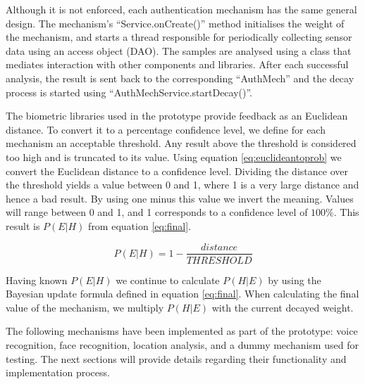 Although it is not enforced, each authentication mechanism has the same general design. The mechanism's ``Service.onCreate()'' method initialises the weight of the mechanism, and starts a thread responsible for periodically collecting sensor data using an access object (DAO). The samples are analysed using a class that mediates interaction with other components and libraries. After each successful analysis, the result is sent back to the corresponding ``AuthMech'' and the decay process is started using ``AuthMechService.startDecay()''.

The biometric libraries used in the prototype provide feedback as an Euclidean distance. To convert it to a percentage confidence level, we define for each mechanism an acceptable threshold. Any result above the threshold is considered too high and is truncated to its value. Using equation \ref{eq:euclideantoprob} we convert the Euclidean distance to a confidence level. Dividing the distance over the threshold yields a value between 0 and 1, where 1 is a very large distance and hence a bad result. By using one minus this value we invert the meaning. Values will range between 0 and 1, and 1 corresponds to a confidence level of $100\%$. This result is $P(E|H)$ from equation \ref{eq:final}.

\begin{equation} 
\label{eq:euclideantoprob}
P(E|H) = 1 - \frac{distance}{THRESHOLD}
\end{equation}

Having known $P(E|H)$ we continue to calculate $P(H|E)$ by using the Bayesian update formula defined in equation \ref{eq:final}. When calculating the final value of the mechanism, we multiply $P(H|E)$ with the current decayed weight.

The following mechanisms have been implemented as part of the prototype: voice recognition, face recognition, location analysis, and a dummy mechanism used for testing. The next sections will provide details regarding their functionality and implementation process.

